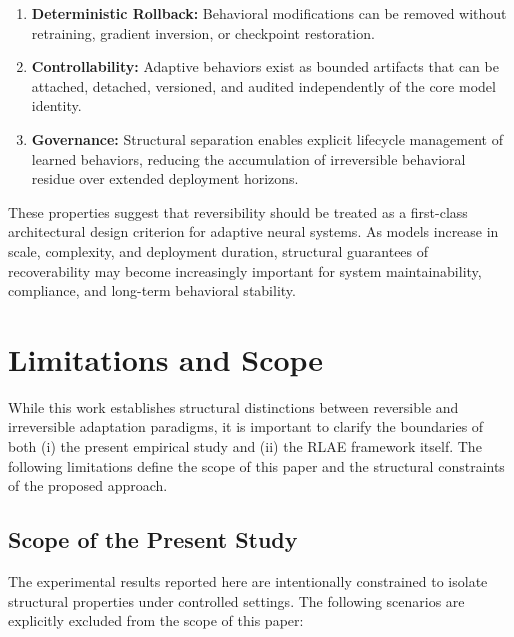 \documentclass{article}
\begin{document}
	\begin{enumerate}
		\item \textbf{Deterministic Rollback:} Behavioral modifications can be removed without retraining, gradient inversion, or checkpoint restoration.
		\item \textbf{Controllability:} Adaptive behaviors exist as bounded artifacts that can be attached, detached, versioned, and audited independently of the core model identity.
		\item \textbf{Governance:} Structural separation enables explicit lifecycle management of learned behaviors, reducing the accumulation of irreversible behavioral residue over extended deployment horizons.
	\end{enumerate}
	
	These properties suggest that reversibility should be treated as a first-class architectural design criterion for adaptive neural systems. As models increase in scale, complexity, and deployment duration, structural guarantees of recoverability may become increasingly important for system maintainability, compliance, and long-term behavioral stability.
	
	\section{Limitations and Scope}
	\label{sec:rlaelimitsandscope}
	
	While this work establishes structural distinctions between reversible and irreversible adaptation paradigms, it is important to clarify the boundaries of both (i) the present empirical study and (ii) the RLAE framework itself. The following limitations define the scope of this paper and the structural constraints of the proposed approach.
	
	\subsection{Scope of the Present Study}
	
	The experimental results reported here are intentionally constrained to isolate structural properties under controlled settings. The following scenarios are explicitly excluded from the scope of this paper:
	
\end{document}
